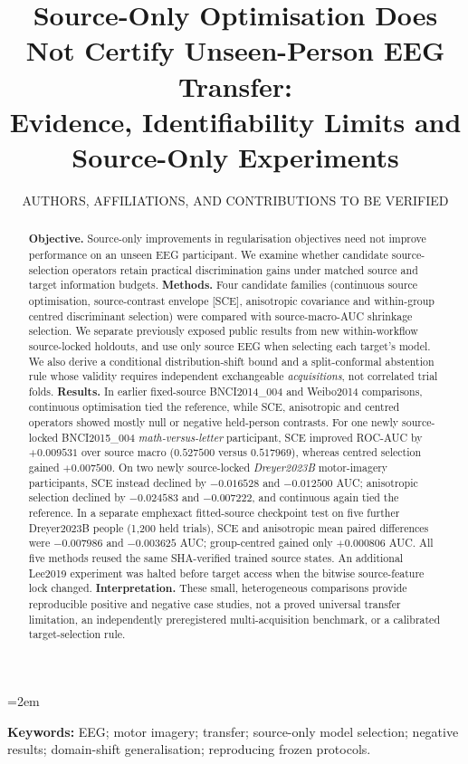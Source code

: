 \documentclass[11pt,a4paper]{article}
\title{Source-Only Optimisation Does Not Certify Unseen-Person EEG Transfer:\\
Evidence, Identifiability Limits and Source-Only Experiments}
\author{AUTHORS, AFFILIATIONS, AND CONTRIBUTIONS TO BE VERIFIED}
\date{}
\begin{document}
\emergencystretch=2em
\maketitle
\begin{abstract}
\textbf{Objective.} Source-only improvements in regularisation
objectives need not improve performance on an unseen EEG
participant. We examine whether candidate source-selection
operators retain practical discrimination gains under
matched source and target information budgets.
\textbf{Methods.} Four candidate families
(continuous source optimisation, source-contrast envelope
[SCE], anisotropic covariance and within-group
centred discriminant selection) were compared with
source-macro-AUC shrinkage selection. We separate
previously exposed public results from new
within-workflow source-locked holdouts, and use
only source EEG when selecting each target's model.
We also derive a conditional distribution-shift bound
and a split-conformal abstention rule whose validity
requires independent exchangeable \emph{acquisitions},
not correlated trial folds.
\textbf{Results.} In earlier fixed-source
BNCI2014\_004 and Weibo2014 comparisons,
continuous optimisation tied the reference, while
SCE, anisotropic and centred operators showed
mostly null or negative held-person contrasts.
For one newly source-locked BNCI2015\_004
\emph{math-versus-letter} participant, SCE improved
ROC-AUC by $+0.009531$ over source macro
($0.527500$ versus $0.517969$), whereas
centred selection gained $+0.007500$.
On two newly source-locked \emph{Dreyer2023B}
motor-imagery participants, SCE instead declined
by $-0.016528$ and $-0.012500$ AUC;
anisotropic selection declined by $-0.024583$
and $-0.007222$, and continuous again tied
the reference. In a separate emph{exact fitted-source
checkpoint} test on five further Dreyer2023B people
(1,200 held trials), SCE and anisotropic mean
paired differences were $-0.007986$ and
$-0.003625$ AUC; group-centred gained only
$+0.000806$ AUC. All five methods reused the
same SHA-verified trained source states. An additional Lee2019 experiment
was halted before target access when the
bitwise source-feature lock changed.
\textbf{Interpretation.} These small, heterogeneous
comparisons provide reproducible positive and
negative case studies, not a proved universal
transfer limitation, an independently
preregistered multi-acquisition benchmark, or
a calibrated target-selection rule.
\end{abstract}
\noindent\textbf{Keywords:} EEG; motor imagery; transfer;
source-only model selection; negative results;
domain-shift generalisation; reproducing frozen protocols.
\end{document}
